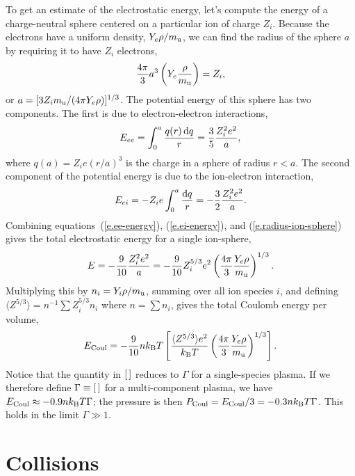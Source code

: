To get an estimate of the electrostatic energy, let's compute the energy of a charge-neutral sphere centered on a particular ion of charge $Z_{i}$.  Because the electrons have a uniform density, $Y_{e}\rho/m_\mathrm{u}$, we can find the radius of the sphere $a$ by requiring it to have $Z_{i}$ electrons,
\begin{equation}\label{e.radius-ion-sphere}
\frac{4\pi}{3}a^{3}\left(Y_{e}\frac{\rho}{m_\mathrm{u}}\right) = Z_{i},
\end{equation}
or $a = [3 Z_{i} m_\mathrm{u}/(4\pi Y_{e}\rho)]^{1/3}$.  The potential energy of this sphere has two components. The first is due to electron-electron interactions,
\begin{equation}\label{e.ee-energy}
E_{ee} = \int_{0}^{a} \frac{q(r)\, \mathrm{d} q}{r} = \frac{3}{5}\frac{Z_{i}^{2}e^{2}}{a},
\end{equation}
where $q(a) = Z_{i}e(r/a)^{3}$ is the charge in a sphere of radius $r < a$. The second component of the potential energy is due to the ion-electron interaction,
\begin{equation}\label{e.ei-energy}
E_{ei} = -Z_{i}e\int_{0}^{a}\frac{\mathrm{d} q}{r} = -\frac{3}{2}\frac{Z_{i}^{2}e^{2}}{a}.
\end{equation}
Combining equations~(\ref{e.ee-energy}), (\ref{e.ei-energy}), and (\ref{e.radius-ion-sphere}) gives the total electrostatic energy for a single ion-sphere,
\begin{equation}\label{e.madelung-sphere}
E = -\frac{9}{10} \frac{Z_{i}^{2}e^{2}}{a} = -\frac{9}{10} Z_{i}^{5/3} e^{2} \left(\frac{4\pi}{3}\frac{Y_{e}\rho}{m_\mathrm{u}}\right)^{1/3}.
\end{equation}
Multiplying this by $n_{i} = Y_{i}\rho/m_\mathrm{u}$, summing over all ion species $i$, and defining $\langle Z^{5/3}\rangle = n^{-1}\sum Z_{i}^{5/3}n_{i}$ where $n = \sum n_{i}$, gives the total Coulomb energy per volume,
\begin{equation}\label{e.madelung-total}
E_{\mathrm{Coul}} = -\frac{9}{10} nk_\mathrm{B} T \left[\frac{\langle Z^{5/3}\rangle e^{2}}{k_\mathrm{B} T}\left(\frac{4\pi}{3}\frac{Y_{e} \rho}{m_\mathrm{u}}\right)^{1/3}\right].
\end{equation}
Notice that the quantity in $[\,]$ reduces to $\Gamma$ for a single-species plasma.  If we therefore define $\Gamma \equiv [\,]$ for a multi-component plasma, we have $E_{\mathrm{Coul}} \approx -0.9 nk_\mathrm{B} T \Gamma$; the pressure is then $P_{\mathrm{Coul}} = E_{\mathrm{Coul}}/3  = -0.3 n k_\mathrm{B} T \Gamma$. This holds in the limit $\Gamma \gg 1$.

\section{Collisions}\label{s.plasma-collisions}

